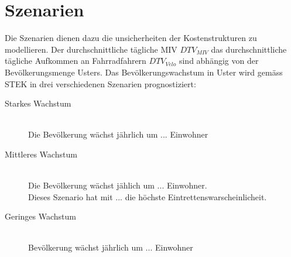 %
%
%
%

\chapter{Szenarien}
\label{chap:Szenarien}

Die Szenarien dienen dazu die unsicherheiten der Kostenstrukturen zu modellieren. Der durchschnittliche tägliche MIV $DTV_{MIV}$ das durchschnittliche tägliche  Aufkommen an Fahrradfahrern $DTV_{Velo}$ sind abhängig von der Bevölkerungsmenge Usters. Das Bevölkerungswachstum in Uster wird gemäss STEK in drei verschiedenen Szenarien prognostiziert:

\begin{description}
\item[Starkes Wachstum] \hfill \\
Die Bevölkerung wächst jährlich um ... Einwohner
\item[Mittleres Wachstum] \hfill \\
Die Bevölkerung wächst jählich um ... Einwohner. \\
Dieses Szenario hat mit ... die höchste Eintrettenswarscheinlicheit.
\item[Geringes Wachstum] \hfill \\
Bevölkerung wächst jährlich um ... Einwohner
\end{description}



%

